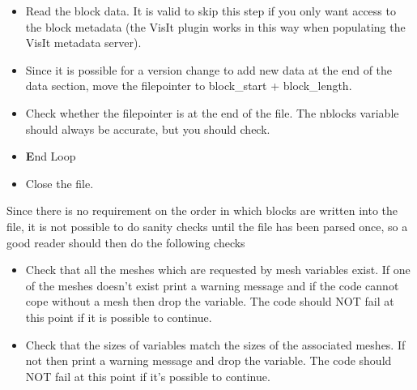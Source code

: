 \documentclass[8pt]{article}
\begin{document}
\begin{itemize}
\item Read the block data. It is valid to skip this step if you only want access to the block metadata (the VisIt plugin works in this way when populating the VisIt metadata server).
\item Since it is possible for a version change to add new data at the end of the data section, move the filepointer to block\_start + block\_length.
\item Check whether the filepointer is at the end of the file. The nblocks variable should always be accurate, but you should check.
\item {\textbf End Loop}
\item Close the file.
\end{itemize}
Since there is no requirement on the order in which blocks are written into the file, it is not possible to do sanity checks until the file has been parsed once, so a good reader should then do the following checks
\begin{itemize}
\item Check that all the meshes which are requested by mesh variables exist. If one of the meshes doesn't exist print a warning message and if the code cannot cope without a mesh then drop the variable. The code should NOT fail at this point if it is possible to continue.
\item Check that the sizes of variables match the sizes of the associated meshes. If not then print a warning message and drop the variable. The code should NOT fail at this point if it's possible to continue.
\end{itemize}
\end{document}
